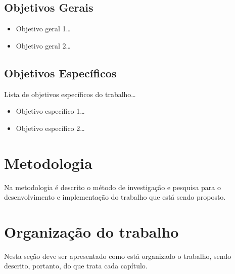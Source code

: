 \subsection{Objetivos Gerais}

\begin{itemize}
  \item Objetivo geral 1\ldots
  \item Objetivo geral 2\ldots  
\end{itemize}

\subsection{Objetivos Específicos} 

Lista de objetivos específicos do trabalho\ldots

\begin{itemize}
  \item Objetivo específico 1\ldots
  \item Objetivo específico 2\ldots  
\end{itemize}

\section{Metodologia}

Na metodologia é descrito o método de investigação e pesquisa para o
desenvolvimento e implementação do trabalho que está sendo proposto.

\section{Organização do trabalho}

Nesta seção deve ser apresentado como está organizado o trabalho, sendo
descrito, portanto, do que trata cada capítulo.
